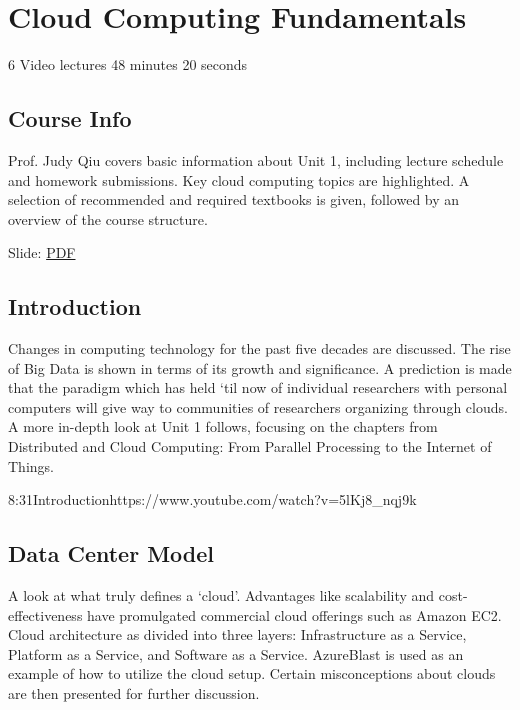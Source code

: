 \chapter{Cloud Computing Fundamentals}

  6 Video lectures {48 minutes 20 seconds}

\section{Course Info}

Prof. Judy Qiu covers basic information about Unit 1, including lecture
schedule and homework submissions. Key cloud computing topics are
highlighted. A selection of recommended and required textbooks is given,
followed by an overview of the course structure.


  Slide:
  \href{https://drive.google.com/open?id=0B88HKpainTSfYjU4QzdDSms0Nk0}{PDF}

\section{Introduction}

Changes in computing technology for the past five decades are discussed.
The rise of Big Data is shown in terms of its growth and significance. A
prediction is made that the paradigm which has held `til now of
individual researchers with personal computers will give way to
communities of researchers organizing through clouds. A more in-depth
look at Unit 1 follows, focusing on the chapters from Distributed and
Cloud Computing: From Parallel Processing to the Internet of Things.

  {8:31}{Introduction}{https://www.youtube.com/watch?v=5lKj8_nqj9k}


\section{Data Center Model}

A look at what truly defines a `cloud'. Advantages like scalability and
cost-effectiveness have promulgated commercial cloud offerings such as
Amazon EC2. Cloud architecture as divided into three layers:
Infrastructure as a Service, Platform as a Service, and Software as a
Service. AzureBlast is used as an example of how to utilize the cloud
setup. Certain misconceptions about clouds are then presented for
further discussion.

